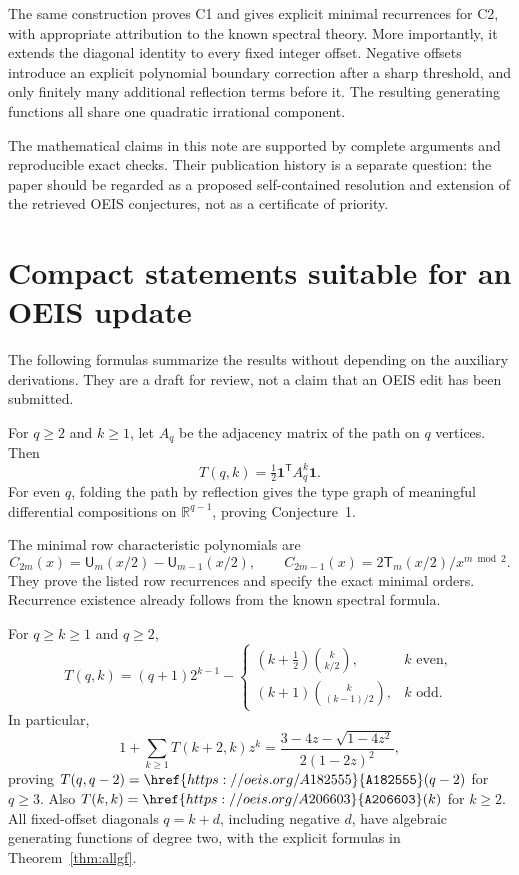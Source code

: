 \documentclass[11pt,letterpaper]{article}
\numberwithin{equation}{section}
\theoremstyle{definition}
\newcommand{\R}{\mathbb R}
\newcommand{\one}{\mathbf 1}
\newcommand{\OEIS}[1]{\href{https://oeis.org/#1}{\texttt{#1}}}
\begin{document}
The same construction proves C1 and gives explicit minimal recurrences
for C2, with appropriate attribution to the known spectral theory.
More importantly, it extends the diagonal identity to every fixed
integer offset.  Negative offsets introduce an explicit polynomial
boundary correction after a sharp threshold, and only finitely many
additional reflection terms before it.  The resulting generating
functions all share one quadratic irrational component.

The mathematical claims in this note are supported by complete
arguments and reproducible exact checks.  Their publication history is
a separate question: the paper should be regarded as a proposed
self-contained resolution and extension of the retrieved OEIS
conjectures, not as a certificate of priority.

\appendix
\section{Compact statements suitable for an OEIS update}
The following formulas summarize the results without depending on the
auxiliary derivations.  They are a draft for review, not a claim that an
OEIS edit has been submitted.

For $q\ge2$ and $k\ge1$, let $A_q$ be the adjacency matrix of the path
on $q$ vertices.  Then
\[
T(q,k)=\tfrac12\one^{\mathsf T}A_q^k\one.
\]
For even $q$, folding the path by reflection gives the type graph of
meaningful differential compositions on $\R^{q-1}$, proving Conjecture~1.

The minimal row characteristic polynomials are
\[
C_{2m}(x)=\mathsf U_m(x/2)-\mathsf U_{m-1}(x/2),\qquad
C_{2m-1}(x)=2\mathsf T_m(x/2)/x^{m\bmod2}.
\]
They prove the listed row recurrences and specify the exact minimal
orders.  Recurrence existence already follows from the known spectral
formula.

For $q\ge k\ge1$ and $q\ge2$,
\[
T(q,k)=(q+1)2^{k-1}-
\begin{cases}
(k+\tfrac12)\binom{k}{k/2},&k\text{ even},\\
(k+1)\binom{k}{(k-1)/2},&k\text{ odd}.
\end{cases}
\]
In particular,
\[
1+\sum_{k\ge1}T(k+2,k)z^k
=\frac{3-4z-\sqrt{1-4z^2}}{2(1-2z)^2},
\]
proving $T(q,q-2)=\OEIS{A182555}(q-2)$ for $q\ge3$.
Also $T(k,k)=\OEIS{A206603}(k)$ for $k\ge2$.
All fixed-offset diagonals $q=k+d$, including negative $d$, have
algebraic generating functions of degree two, with the explicit
formulas in Theorem~\ref{thm:allgf}.
\end{document}
